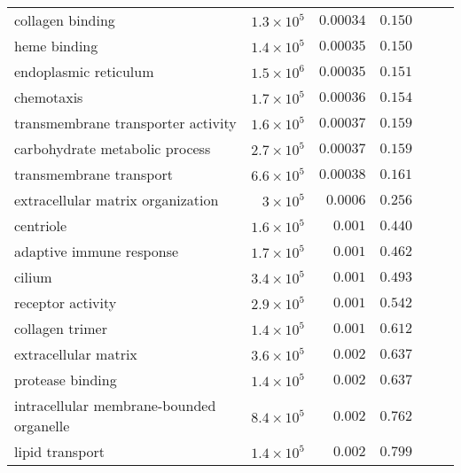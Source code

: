 \begin{longtable}{|l|r|r|r|r|r|}
    collagen binding                         & $1.3\times 10^{5}$ & $0.00034$            & $ 0.150~~$                      \\
    heme binding                             & $1.4\times 10^{5}$ & $0.00035$            & $ 0.150~~$                      \\
    endoplasmic reticulum                    & $1.5\times 10^{6}$ & $0.00035$            & $ 0.151~~$                      \\
    chemotaxis                               & $1.7\times 10^{5}$ & $0.00036$            & $ 0.154~~$                      \\
    transmembrane transporter activity       & $1.6\times 10^{5}$ & $0.00037$            & $ 0.159~~$                      \\
    carbohydrate metabolic process           & $2.7\times 10^{5}$ & $0.00037$            & $ 0.159~~$                      \\
    transmembrane transport                  & $6.6\times 10^{5}$ & $0.00038$            & $ 0.161~~$                      \\
    extracellular matrix organization        & $ 3\times 10^{5}$  & $0.0006$             & $ 0.256~~$                      \\
    centriole                                & $1.6\times 10^{5}$ & $ 0.001$             & $ 0.440~~$                      \\
    adaptive immune response                 & $1.7\times 10^{5}$ & $ 0.001$             & $ 0.462~~$                      \\
    cilium                                   & $3.4\times 10^{5}$ & $ 0.001$             & $ 0.493~~$                      \\
    receptor activity                        & $2.9\times 10^{5}$ & $ 0.001$             & $ 0.542~~$                      \\
    collagen trimer                          & $1.4\times 10^{5}$ & $ 0.001$             & $ 0.612~~$                      \\
    extracellular matrix                     & $3.6\times 10^{5}$ & $ 0.002$             & $ 0.637~~$                      \\
    protease binding                         & $1.4\times 10^{5}$ & $ 0.002$             & $ 0.637~~$                      \\
    intracellular membrane-bounded organelle & $8.4\times 10^{5}$ & $ 0.002$             & $ 0.762~~$                      \\
    lipid transport                          & $1.4\times 10^{5}$ & $ 0.002$             & $ 0.799~~$                      \\
\end{longtable}